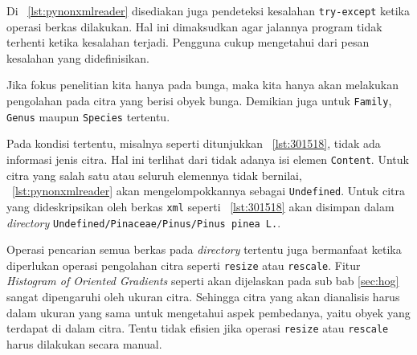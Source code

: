 \scriptsize

\normalsize

Di \lstlistingname~\ref{lst:pynonxmlreader} disediakan juga pendeteksi kesalahan \texttt{try-except} ketika operasi berkas dilakukan. Hal ini dimaksudkan agar jalannya program tidak terhenti ketika kesalahan terjadi. Pengguna cukup mengetahui dari pesan kesalahan yang didefinisikan.

Jika fokus penelitian kita hanya pada bunga, maka kita hanya akan melakukan pengolahan pada citra yang berisi obyek bunga. Demikian juga untuk \texttt{Family}, \texttt{Genus} maupun \texttt{Species} tertentu.

Pada kondisi tertentu, misalnya seperti ditunjukkan \lstlistingname~\ref{lst:301518}, tidak ada informasi jenis citra. Hal ini terlihat dari tidak adanya isi elemen \texttt{Content}. Untuk citra yang salah satu atau seluruh elemennya tidak bernilai, \lstlistingname~\ref{lst:pynonxmlreader} akan mengelompokkannya sebagai \texttt{Undefined}. Untuk citra yang dideskripsikan oleh berkas \texttt{xml} seperti \lstlistingname~\ref{lst:301518} akan disimpan dalam \textit{directory} \texttt{Undefined/Pinaceae/Pinus/Pinus\ pinea\ L.}.

\scriptsize

\normalsize

Operasi pencarian semua berkas pada \textit{directory} tertentu juga bermanfaat ketika diperlukan operasi pengolahan citra seperti \texttt{resize} atau \texttt{rescale}. Fitur \textit{Histogram of Oriented Gradients} seperti akan dijelaskan pada sub bab \ref{sec:hog} sangat dipengaruhi oleh ukuran citra. Sehingga citra yang akan dianalisis harus dalam ukuran yang sama untuk mengetahui aspek pembedanya, yaitu obyek yang terdapat di dalam citra. Tentu tidak efisien jika operasi \texttt{resize} atau \texttt{rescale} harus dilakukan secara manual.
